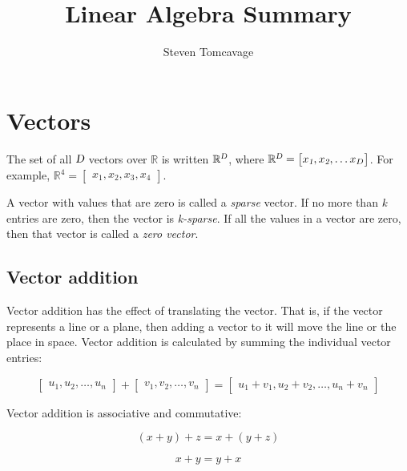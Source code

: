 \documentclass[11pt, oneside]{article}   	%
\title{Linear Algebra Summary}
\author{Steven Tomcavage}
\begin{document}
\maketitle

\section{Vectors}

The set of all $\textsl{D}$ vectors over $\mathbb{R}$ is written $\mathbb{R}^{\textsl{D}}$, where $\mathbb{R}^{\textsl{D}} = \begin{bmatrix}x_\textsl{1}, x_\textsl{2}, \dots x_{D} \end{bmatrix}$. For example, $ \mathbb{R}^4 =\begin{bmatrix} x_1, x_2, x_3, x_4 \end{bmatrix} $. 

A vector with values that are zero is called a \textit{sparse} vector. If no more than \textit{k} entries are zero, then the vector is \textit{k-sparse}. If all the values in a vector are zero, then that vector is called a \textit{zero vector}.

\subsection{Vector addition}

Vector addition has the effect of translating the vector. That is, if the vector represents a line or a plane, then adding a vector to it will move the line or the place in space. Vector addition is calculated by summing the individual vector entries:

\begin{displaymath}
\begin{bmatrix}u_1, u_2, \dots, u_n\end{bmatrix} + \begin{bmatrix}v_1, v_2, \dots, v_n\end{bmatrix} = \begin{bmatrix}u_1 + v_1, u_2 + v_2, \dots, u_n + v_n \end{bmatrix}
\end{displaymath}

Vector addition is associative and commutative:

\begin{displaymath}
(x + y) + z = x + (y + z)
\end{displaymath}

\begin{displaymath}
x + y = y + x
\end{displaymath}
\end{document}
